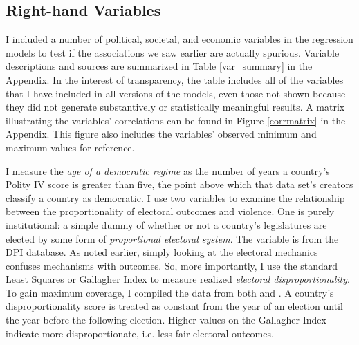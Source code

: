 \documentclass[a4paper]{article}\usepackage[]{graphicx}\usepackage[]{color}
\begin{document}
\subsection{Right-hand Variables}

I included a number of political, societal, and economic variables in the regression models to test if the associations we saw earlier are actually spurious. Variable descriptions and sources are summarized in Table \ref{var_summary} in the Appendix. In the interest of transparency, the table includes all of the variables that I have included in all versions of the models, even those not shown because they did not generate substantively or statistically meaningful results. A matrix illustrating the variables' correlations can be found in Figure \ref{corrmatrix} in the Appendix. This figure also includes the variables' observed minimum and maximum values for reference. 

I measure the {\emph{age of a democratic regime}} as the number of years a country's Polity IV score is greater than five, the point above which that data set's creators classify a country as democratic. I use two variables to examine the relationship between the proportionality of electoral outcomes and violence. One is purely institutional: a simple dummy of whether or not a country's legislatures are elected by some form of {\emph{proportional electoral system}}. The variable is from the DPI database. As noted earlier, simply looking at the electoral mechanics confuses mechanisms with outcomes. So, more importantly, I use the standard Least Squares or Gallagher Index \citep{Gallagher1991} to measure realized {\emph{electoral disproportionality}}. To gain maximum coverage, I compiled the data from both \cite{Gallagher2012} and \cite{Carey2011}. A country's disproportionality score is treated as constant from the year of an election until the year before the following election. Higher values on the Gallagher Index indicate more disproportionate, i.e. less fair electoral outcomes. 
\end{document}
